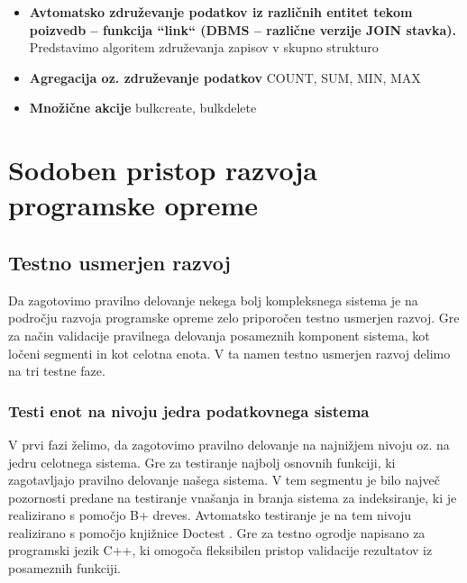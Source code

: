 \documentclass[a4paper,12pt,openright]{book}
\begin{document}
\begin{itemize}
        \item \textbf{Avtomatsko združevanje podatkov iz različnih entitet tekom poizvedb – funkcija ``link`` (DBMS – različne verzije JOIN stavka).}
        \colorbox{BurntOrange}{Predstavimo algoritem združevanja zapisov v skupno strukturo}

        \item \textbf{Agregacija oz. združevanje podatkov}
        \newline
        \colorbox{BurntOrange}{COUNT, SUM, MIN, MAX}

        \item \textbf{Množične akcije}
        \newline
        \colorbox{BurntOrange}{bulkcreate, bulkdelete}
    \end{itemize}

\chapter{Sodoben pristop razvoja programske opreme}
\label{ch1}

    \section{Testno usmerjen razvoj}

    Da zagotovimo pravilno delovanje nekega bolj kompleksnega sistema je na področju razvoja programske opreme zelo priporočen testno usmerjen razvoj. Gre za način validacije pravilnega delovanja posameznih komponent sistema, kot ločeni segmenti in kot celotna enota. V ta namen testno usmerjen razvoj delimo na tri testne faze. 
   
   \subsection{Testi enot na nivoju jedra podatkovnega sistema}

    V prvi fazi želimo, da zagotovimo pravilno delovanje na najnižjem nivoju oz. na jedru celotnega sistema. Gre za testiranje najbolj osnovnih funkciji, ki zagotavljajo pravilno delovanje našega sistema. V tem segmentu je bilo največ pozornosti predane na testiranje vnašanja in branja sistema za indeksiranje, ki je realizirano s pomočjo B+ dreves. Avtomatsko testiranje je na tem nivoju realizirano s pomočjo knjižnice Doctest \cite{DOCTEST_GITHUB}. Gre za testno ogrodje napisano za programski jezik C++, ki omogoča fleksibilen pristop validacije rezultatov iz posameznih funkciji.
   
\end{document}
